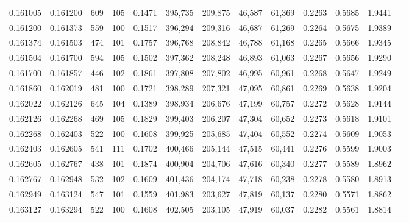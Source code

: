 \begin{tabular}{rrrrrrrrrrrrr}
0.161005 & 0.161200 &   609 & 105 &                                     0.1471 & 395,735 & 209,875 &  46,587 &  61,369 & 0.2263 & 0.5685 & 1.9441 \\
0.161200 & 0.161373 &   559 & 100 &                                     0.1517 & 396,294 & 209,316 &  46,687 &  61,269 & 0.2264 & 0.5675 & 1.9389 \\
0.161374 & 0.161503 &   474 & 101 &                                     0.1757 & 396,768 & 208,842 &  46,788 &  61,168 & 0.2265 & 0.5666 & 1.9345 \\
0.161504 & 0.161700 &   594 & 105 &                                     0.1502 & 397,362 & 208,248 &  46,893 &  61,063 & 0.2267 & 0.5656 & 1.9290 \\
0.161700 & 0.161857 &   446 & 102 &                                     0.1861 & 397,808 & 207,802 &  46,995 &  60,961 & 0.2268 & 0.5647 & 1.9249 \\
0.161860 & 0.162019 &   481 & 100 &                                     0.1721 & 398,289 & 207,321 &  47,095 &  60,861 & 0.2269 & 0.5638 & 1.9204 \\
0.162022 & 0.162126 &   645 & 104 &                                     0.1389 & 398,934 & 206,676 &  47,199 &  60,757 & 0.2272 & 0.5628 & 1.9144 \\
0.162126 & 0.162268 &   469 & 105 &                                     0.1829 & 399,403 & 206,207 &  47,304 &  60,652 & 0.2273 & 0.5618 & 1.9101 \\
0.162268 & 0.162403 &   522 & 100 &                                     0.1608 & 399,925 & 205,685 &  47,404 &  60,552 & 0.2274 & 0.5609 & 1.9053 \\
0.162403 & 0.162605 &   541 & 111 &                                     0.1702 & 400,466 & 205,144 &  47,515 &  60,441 & 0.2276 & 0.5599 & 1.9003 \\
0.162605 & 0.162767 &   438 & 101 &                                     0.1874 & 400,904 & 204,706 &  47,616 &  60,340 & 0.2277 & 0.5589 & 1.8962 \\
0.162767 & 0.162948 &   532 & 102 &                                     0.1609 & 401,436 & 204,174 &  47,718 &  60,238 & 0.2278 & 0.5580 & 1.8913 \\
0.162949 & 0.163124 &   547 & 101 &                                     0.1559 & 401,983 & 203,627 &  47,819 &  60,137 & 0.2280 & 0.5571 & 1.8862 \\
0.163127 & 0.163294 &   522 & 100 &                                     0.1608 & 402,505 & 203,105 &  47,919 &  60,037 & 0.2282 & 0.5561 & 1.8814 \\

\end{tabular}
